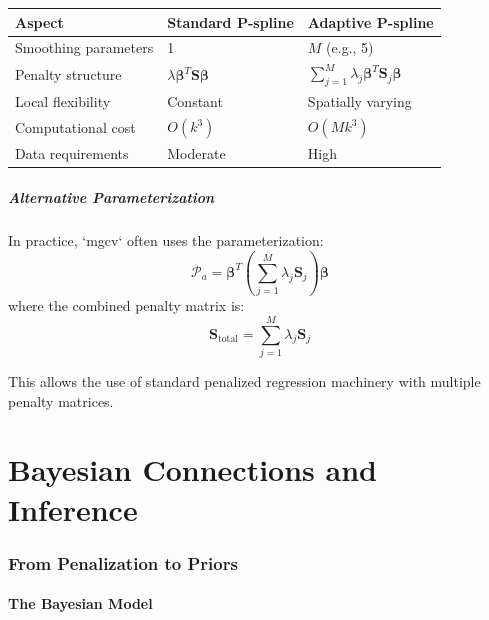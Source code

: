 \documentclass[12pt]{article}
\begin{document}
\begin{table}[h]
\centering
\begin{tabular}{lll}
\toprule
\textbf{Aspect} & \textbf{Standard P-spline} & \textbf{Adaptive P-spline} \\
\midrule
Smoothing parameters & 1 & $M$ (e.g., 5) \\
Penalty structure & $\lambda \boldsymbol{\beta}^T \mathbf{S} \boldsymbol{\beta}$ & $\sum_{j=1}^M \lambda_j \boldsymbol{\beta}^T \mathbf{S}_j \boldsymbol{\beta}$ \\
Local flexibility & Constant & Spatially varying \\
Computational cost & $O(k^3)$ & $O(Mk^3)$ \\
Data requirements & Moderate & High \\
\bottomrule
\end{tabular}
\end{table}

\subsubsection{Alternative Parameterization}

In practice, `mgcv` often uses the parameterization:
\begin{equation}
\mathcal{P}_a = \boldsymbol{\beta}^T \left(\sum_{j=1}^M \lambda_j \mathbf{S}_j\right) \boldsymbol{\beta}
\end{equation}
where the combined penalty matrix is:
\begin{equation}
\mathbf{S}_{\text{total}} = \sum_{j=1}^M \lambda_j \mathbf{S}_j
\end{equation}

This allows the use of standard penalized regression machinery with multiple penalty matrices.

\part{Bayesian Connections and Inference}

\section{From Penalization to Priors}

\subsection{The Bayesian Model}
\end{document}

